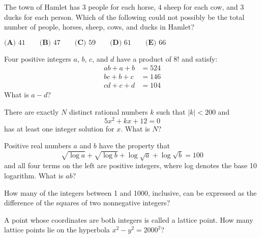 \documentclass{article}
\begin{document}
\begin{prob}[AMC 10B 2015/15]{1}

The town of Hamlet has $3$ people for each horse, $4$ sheep for each cow, and $3$ ducks for each person. Which of the following could not possibly be the total number of people, horses, sheep, cows, and ducks in Hamlet?
\begin{center}
    $\textbf{(A) }41\qquad\textbf{(B) }47\qquad\textbf{(C) }59\qquad\textbf{(D) }61\qquad\textbf{(E) }66$
\end{center}

\end{prob}

\begin{prob}[AMC 12 2001/21]{2}

Four positive integers $a$, $b$, $c$, and $d$ have a product of $8!$ and satisfy:
\begin{align*} ab + a + b & = 524 \\  bc + b + c & = 146 \\  cd + c + d & = 104 \end{align*}
What is $a-d$?

\end{prob}

\begin{prob}[AMC 12A 2014/19]{2}

There are exactly $N$ distinct rational numbers $k$ such that $|k|<200$ and\[5x^2+kx+12=0\]has at least one integer solution for $x$. What is $N$?

\end{prob}

\begin{prob}[AMC 12A 2019/15]{2}

Positive real numbers $a$ and $b$ have the property that\[\sqrt{\log{a}} + \sqrt{\log{b}} + \log \sqrt{a} + \log \sqrt{b} = 100\]and all four terms on the left are positive integers, where log denotes the base 10 logarithm. What is $ab$?

\end{prob}

\begin{prob}[AIME 1997/1]{3}

How many of the integers between 1 and 1000, inclusive, can be expressed as the difference of the squares of two nonnegative integers?

\end{prob}

\begin{prob}[AIME II 2000/2]{4}

A point whose coordinates are both integers is called a lattice point. How many lattice points lie on the hyperbola $x^2 -y^2 = 2000^2$?

\end{prob}
\end{document}
